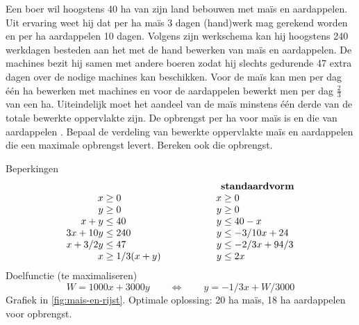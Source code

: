 \begin{oef}\label{oef:mais-rijst}
Een boer wil hoogstens 40 ha van zijn land bebouwen met
ma\"{i}s en aardappelen. Uit ervaring weet hij dat per ha ma\"is
$3$ dagen (hand)werk mag gerekend worden en per ha aardappelen 10 dagen.
Volgens zijn werkschema kan hij hoogstens 240 werkdagen besteden
aan het met de hand bewerken van ma\"is en aardappelen. De machines
bezit hij samen met andere boeren zodat hij slechts gedurende 47
extra dagen over de nodige machines kan beschikken. Voor de 
ma\"{i}s kan men per dag  \'e\'en ha bewerken met 
machines en voor 
de aardappelen bewerkt men per dag $\frac{2}{3}$ van een ha. 
Uiteindelijk  moet het aandeel van de ma\"{i}s minstens  \'e\'en
derde van de totale bewerkte oppervlakte zijn. De opbrengst
per ha voor ma\"is  is en die van aardappelen .
Bepaal de verdeling van bewerkte oppervlakte ma\"is en
aardappelen die een maximale opbrengst levert. Bereken ook die
opbrengst. 
\begin{opl}
Beperkingen
\[
  \begin{array}{r@{\;}c@{\;}l@{\hspace{2cm}}r@{\;}c@{\;}l}
    &&& \multicolumn{3}{c}{\mathbf{standaardvorm}} \\
    x & \geq & 0 &            x & \geq & 0\\
    y & \geq & 0 &            y & \geq & 0 \\
    x + y & \leq & 40 &       y & \leq & 40 - x \\
    3x + 10y & \leq & 240 &   y & \leq & -3/10x+24\\
    x+3/2y & \leq & 47 &      y & \leq & -2/3x+94/3 \\
    x & \geq & 1/3(x+y) &     y & \leq & 2x \\
  \end{array}
\]
Doelfunctie (te maximaliseren)
\[
  W = 1000x+3000y \qquad \iff \qquad y = -1/3x + W/3000
\]
Grafiek in \cref{fig:mais-en-rijst}. Optimale oplossing: 20 ha ma\"is, 18 ha aardappelen voor  opbrengst.
\begin{figure}[hbtp]
  \centering
\end{figure}
\end{opl}
\end{oef}
